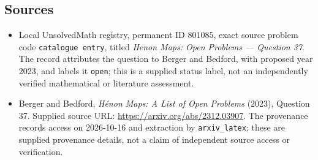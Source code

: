 \documentclass[11pt]{article}
\begin{document}
\subsection{Sources}
\begin{itemize}
\item Local UnsolvedMath registry, permanent ID \(801085\), exact source problem code \texttt{catalogue entry}, titled \emph{Henon Maps: Open Problems --- Question 37}. The record attributes the question to Berger and Bedford, with proposed year 2023, and labels it \texttt{open}; this is a supplied status label, not an independently verified mathematical or literature assessment.
\item Berger and Bedford, \emph{H\'enon Maps: A List of Open Problems} (2023), Question 37. Supplied source URL: \url{https://arxiv.org/abs/2312.03907}. The provenance records access on 2026-10-16 and extraction by \texttt{arxiv\_latex}; these are supplied provenance details, not a claim of independent source access or verification.
\end{itemize}
\end{document}
